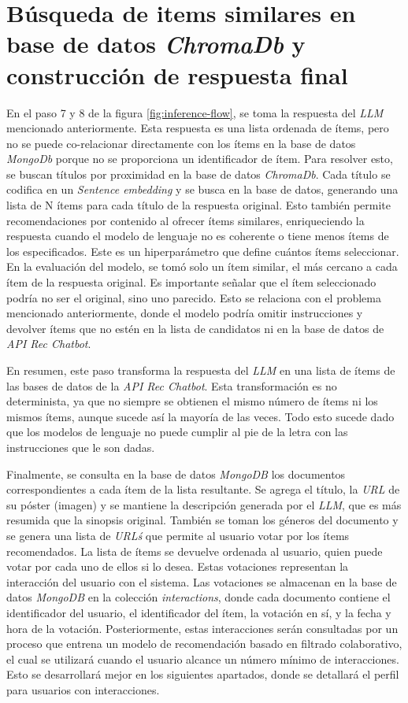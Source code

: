 \documentclass[11pt,a4paper,twoside]{thesis}
\begin{document}
\section{Búsqueda de items similares en base de datos \textit{ChromaDb} y construcción de respuesta final}

En el paso 7 y 8 de la figura \ref{fig:inference-flow}, se toma la respuesta del \textit{LLM} mencionado anteriormente. Esta respuesta es una lista ordenada de ítems, pero no se puede co-relacionar directamente con los ítems en la base de datos \textit{MongoDb} porque no se proporciona un identificador de ítem. Para resolver esto, se buscan títulos por proximidad en la base de datos \textit{ChromaDb}. Cada título se codifica en un \textit{Sentence embedding} y se busca en la base de datos, generando una lista de N ítems para cada título de la respuesta original. Esto también permite recomendaciones por contenido al ofrecer ítems similares, enriqueciendo la respuesta cuando el modelo de lenguaje no es coherente o tiene menos ítems de los especificados. Este es un hiperparámetro que define cuántos ítems seleccionar. En la evaluación del modelo, se tomó solo un ítem similar, el más cercano a cada ítem de la respuesta original. Es importante señalar que el ítem seleccionado podría no ser el original, sino uno parecido. Esto se relaciona con el problema mencionado anteriormente, donde el modelo podría omitir instrucciones y devolver ítems que no estén en la lista de candidatos ni en la base de datos de \textit{API Rec Chatbot}.

En resumen, este paso transforma la respuesta del \textit{LLM} en una lista de ítems de las bases de datos de la \textit{API Rec Chatbot}. Esta transformación es no determinista, ya que no siempre se obtienen el mismo número de ítems ni los mismos ítems, aunque sucede así la mayoría de las veces. Todo esto sucede dado que los modelos de lenguaje no puede cumplir al pie de la letra con las instrucciones que le son dadas.

Finalmente, se consulta en la base de datos \textit{MongoDB} los documentos correspondientes a cada ítem de la lista resultante. Se agrega el título, la \textit{URL} de su póster (imagen) y se mantiene la descripción generada por el \textit{LLM}, que es más resumida que la sinopsis original. También se toman los géneros del documento y se genera una lista de \textit{URL\'s} que permite al usuario votar por los ítems recomendados. La lista de ítems se devuelve ordenada al usuario, quien puede votar por cada uno de ellos si lo desea. Estas votaciones representan la interacción del usuario con el sistema. Las votaciones se almacenan en la base de datos \textit{MongoDB} en la colección \textit{interactions}, donde cada documento contiene el identificador del usuario, el identificador del ítem, la votación en sí, y la fecha y hora de la votación. Posteriormente, estas interacciones serán consultadas por un proceso que entrena un modelo de recomendación basado en filtrado colaborativo, el cual se utilizará cuando el usuario alcance un número mínimo de interacciones. Esto se desarrollará mejor en los siguientes apartados, donde se detallará el perfil para usuarios con interacciones.
\vfill
\end{document}
